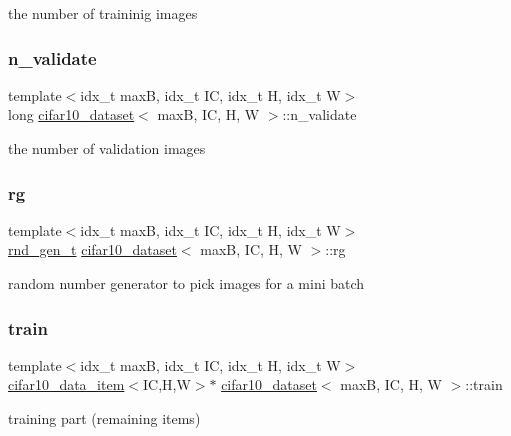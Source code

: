 the number of traininig images \mbox{\label{structcifar10__dataset_a0f447993bfd499e4222e66dca3e111a0}} 
\subsubsection{\texorpdfstring{n\+\_\+validate}{n\_validate}}
{\footnotesize\ttfamily template$<$idx\+\_\+t maxB, idx\+\_\+t IC, idx\+\_\+t H, idx\+\_\+t W$>$ \\
long \hyperlink{structcifar10__dataset}{cifar10\+\_\+dataset}$<$ maxB, IC, H, W $>$\+::n\+\_\+validate}

the number of validation images \mbox{\label{structcifar10__dataset_a59998ba824d0a527fe0f6e7aad0693eb}} 
\subsubsection{\texorpdfstring{rg}{rg}}
{\footnotesize\ttfamily template$<$idx\+\_\+t maxB, idx\+\_\+t IC, idx\+\_\+t H, idx\+\_\+t W$>$ \\
\hyperlink{structrnd__gen__t}{rnd\+\_\+gen\+\_\+t} \hyperlink{structcifar10__dataset}{cifar10\+\_\+dataset}$<$ maxB, IC, H, W $>$\+::rg}

random number generator to pick images for a mini batch \mbox{\label{structcifar10__dataset_a0c64c36b940f91c63a9d5f89360f5335}} 
\subsubsection{\texorpdfstring{train}{train}}
{\footnotesize\ttfamily template$<$idx\+\_\+t maxB, idx\+\_\+t IC, idx\+\_\+t H, idx\+\_\+t W$>$ \\
\hyperlink{structcifar10__data__item}{cifar10\+\_\+data\+\_\+item}$<$IC,H,W$>$$\ast$ \hyperlink{structcifar10__dataset}{cifar10\+\_\+dataset}$<$ maxB, IC, H, W $>$\+::train}

training part (remaining items) \mbox{\label{structcifar10__dataset_a3264803c2eb493dabaedb7eca4d7725f}} 
